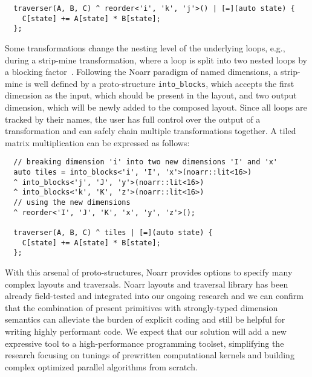 \begin{verbatim}
  traverser(A, B, C) ^ reorder<'i', 'k', 'j'>() | [=](auto state) {
    C[state] += A[state] * B[state];
  };
\end{verbatim}

Some transformations change the nesting level of the underlying loops, e.g., during a strip-mine transformation, where a loop is split into two nested loops by a blocking factor~\cite{mckinley1996improving}. Following the Noarr paradigm of named dimensions, a strip-mine is well defined by a proto-structure \texttt{into_blocks}, which accepts the first dimension as the input, which should be present in the layout, and two output dimension, which will be newly added to the composed layout. Since all loops are tracked by their names, the user has full control over the output of a transformation and can safely chain multiple transformations together. A tiled matrix multiplication can be expressed as follows:
\begin{verbatim}
  // breaking dimension 'i' into two new dimensions 'I' and 'x'
  auto tiles = into_blocks<'i', 'I', 'x'>(noarr::lit<16>)
  ^ into_blocks<'j', 'J', 'y'>(noarr::lit<16>)
  ^ into_blocks<'k', 'K', 'z'>(noarr::lit<16>)
  // using the new dimensions
  ^ reorder<'I', 'J', 'K', 'x', 'y', 'z'>(); 

  traverser(A, B, C) ^ tiles | [=](auto state) {
    C[state] += A[state] * B[state];
  }; 
\end{verbatim}

With this arsenal of proto-structures, Noarr provides options to specify many complex layouts and traversals. Noarr layouts and traversal library has been already field-tested and integrated into our ongoing research and we can confirm that the combination of present primitives with strongly-typed dimension semantics can alleviate the burden of explicit coding and still be helpful for writing highly performant code. We expect that our solution will add a new expressive tool to a high-performance programming toolset, simplifying the research focusing on tunings of prewritten computational kernels and building complex optimized parallel algorithms from scratch.


